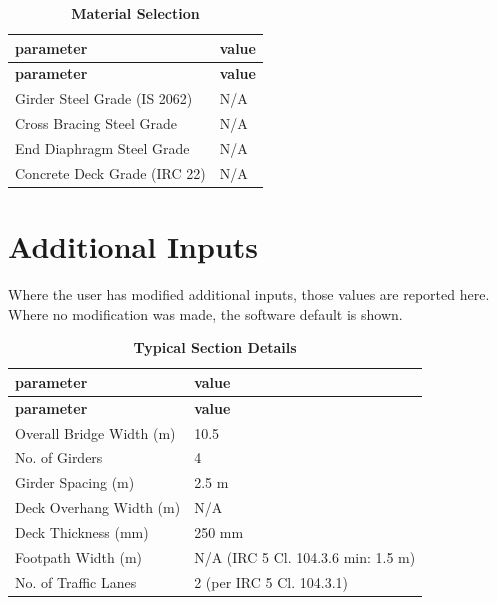 \documentclass[12pt,a4paper]{report}
\numberwithin{table}{chapter}
\numberwithin{figure}{chapter}
\newcommand{\ReportTableSetup}{%
  \setlength{\tabcolsep}{3.0pt}%
  \renewcommand{\arraystretch}{1.18}%
  \setlength{\arrayrulewidth}{0.4pt}\setlength{\extrarowheight}{0.5pt}%
  \setlength{\LTleft}{\fill}\setlength{\LTright}{\fill}%
  \setlength{\LTpre}{4pt}\setlength{\LTpost}{8pt}}
\newcommand{\ReportTableFont}{\small}
\newcommand{\ReportRowGap}{3.0pt}
\newcommand{\ReportTableGap}{\vspace{0.5em}}
\begin{document}
\begingroup
\ReportTableSetup
\ReportTableFont
\begin{longtable}{|L{5.5000cm}|L{8.5000cm}|}

\caption{\textbf{Material Selection}}
\label{subsec:material}\\

\hline
\textbf{parameter} & \textbf{value} \\
\hline
\endfirsthead
\hline
\textbf{parameter} & \textbf{value} \\
\hline
\endhead
\hline
\endfoot
\hline
\endlastfoot

\textnormal{Girder Steel Grade (IS 2062)} & N/A \\
\hline
\textnormal{Cross Bracing Steel Grade} & N/A \\
\hline
\textnormal{End Diaphragm Steel Grade} & N/A \\
\hline
\textnormal{Concrete Deck Grade (IRC 22)} & N/A \\
\hline
\end{longtable}
\endgroup

\ReportTableGap

\section{Additional Inputs}
\label{sec:additional-inputs}

Where the user has modified additional inputs, those values are reported here. Where no modification was made, the software default is shown.

\ReportTableGap

\begingroup
\ReportTableSetup
\ReportTableFont
\begin{longtable}{|L{5.5000cm}|p{10.0000cm}|}
\caption{\textbf{Typical Section Details}}\\
\hline
\textbf{parameter} & \textbf{value} \\
\hline
\endfirsthead
\hline
\textbf{parameter} & \textbf{value} \\
\hline
\endhead
\hline
\endfoot
\hline
\endlastfoot

\textnormal{Overall Bridge Width (m)} & 10.5 \\[\ReportRowGap]
\hline
\textnormal{No. of Girders} & 4 \\[\ReportRowGap]
\hline
\textnormal{Girder Spacing (m)} & 2.5 m \\[\ReportRowGap]
\hline
\textnormal{Deck Overhang Width (m)} & N/A \\[\ReportRowGap]
\hline
\textnormal{Deck Thickness (mm)} & 250 mm \\[\ReportRowGap]
\hline
\textnormal{Footpath Width (m)} & N/A (IRC 5 Cl. 104.3.6 min: 1.5 m) \\[\ReportRowGap]
\hline
\textnormal{No. of Traffic Lanes} & 2 (per IRC 5 Cl. 104.3.1) \\[\ReportRowGap]
\hline
\end{longtable}
\endgroup
\end{document}
